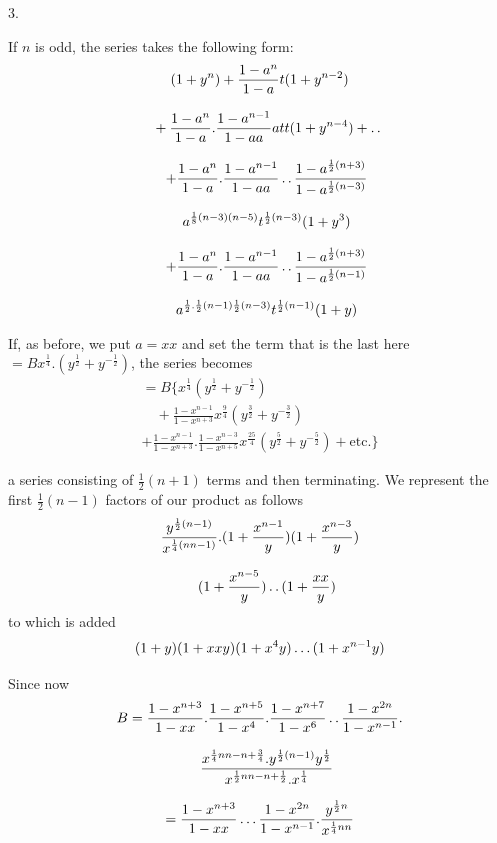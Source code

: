 \par\medskip{}\centerline{3.}\nobreak\smallskip
If $n$ is odd, the series takes the following form:
\[
\begin{gathered}
(1+y^n)+\frac{1-a^n}{1-a}t(1+y^{n-2})
\\[8pt]\quad{}+\frac{1-a^n}{1-a}.\frac{1-a^{n-1}}{1-aa}att(1+y^{n-4})+\mathinner{.\,.}\\[8pt]
\quad+\frac{1-a^n}{1-a}.\frac{1-a^{n-1}}{1-aa}\mathinner{.\,.}\frac{1-a^{\frac12(n+3)}}{1-a^{\frac12(n-3)}}\\[8pt]\quad{}a^{\frac18(n-3)(n-5)}t^{\frac12(n-3)}(1+y^3)\\[8pt]
\quad+\frac{1-a^n}{1-a}.\frac{1-a^{n-1}}{1-aa}\mathinner{.\,.}\frac{1-a^{\frac12(n+3)}}{1-a^{\frac12(n-1)}}\\[8pt]\quad{}a^{\frac12.\frac12(n-1)\frac12(n-3)}t^{\frac12(n-1)}(1+y)
\end{gathered}
\]

If, as before, we put $a=xx$ and set the term that is the last here $=Bx^{\frac14}.(y^{\frac12}+y^{-\frac12})$, the series becomes
\[
\begin{gathered}
=B\{x^{\frac14}(y^{\frac12}+y^{-\frac12})
\\[8pt]\quad{}+\frac{1-x^{n-1}}{1-x^{n+3}}x^{\frac94}(y^{\frac32}+y^{-\frac32})\\[8pt]
+\frac{1-x^{n-1}}{1-x^{n+3}}.\frac{1-x^{n-3}}{1-x^{n+5}}x^{\frac{25}4}(y^{\frac52}+y^{-\frac52})+\text{etc.}\}
\end{gathered}
\]




a series consisting of $\frac12(n+1)$ terms and then terminating. We represent the first $\frac12(n-1)$ factors of our product as follows
\[
\begin{gathered}\frac{y^{\frac12(n-1)}}{x^{\frac14(nn-1)}}.(1+\frac{x^{n-1}}y)(1+\frac{x^{n-3}}y)\\[8pt]\quad{}(1+\frac{x^{n-5}}y)\mathinner{.\,.}(1+\frac{xx}y)\end{gathered}
\]
to which is added
\[
(1+y)(1+xxy)(1+x^4y)\mathinner{.\,.\,.}(1+x^{n-1}y)
\]

Since now
\[
\begin{gathered}
B=\frac{1-x^{n+3}}{1-xx}.\frac{1-x^{n+5}}{1-x^4}.\frac{1-x^{n+7}}{1-x^6}\mathinner{.\,.}\frac{1-x^{2n}}{1-x^{n-1}}.
\\[8pt]\quad{}\frac{x^{\frac14nn-n+\frac34}.y^{\frac12(n-1)}y^{\frac12}}{x^{\frac12nn-n+\frac12}.x^{\frac14}}\\[8pt]
=\frac{1-x^{n+3}}{1-xx}\mathinner{.\,.\,.}\frac{1-x^{2n}}{1-x^{n-1}}.\frac{y^{\frac12n}}{x^{\frac14nn}}
\end{gathered}
\]

